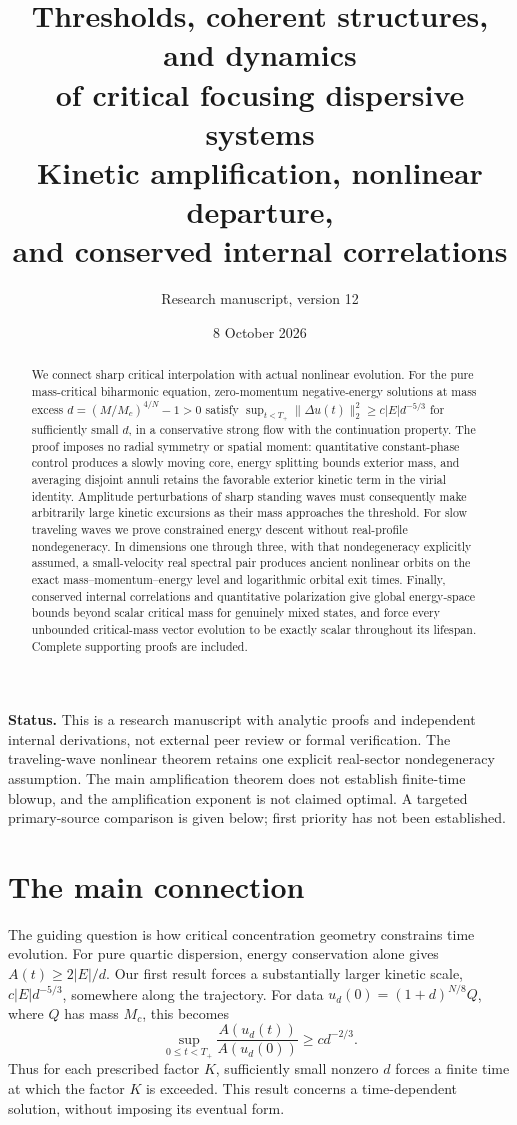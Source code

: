 \documentclass[11pt,a4paper]{article}
\title{Thresholds, coherent structures, and dynamics\\of critical focusing dispersive systems\\[5pt]
\large Kinetic amplification, nonlinear departure,\\and conserved internal correlations}
\author{Research manuscript, version 12}
\date{8 October 2026}
\theoremstyle{remark}\newtheorem{remark}[theorem]{Remark}
\begin{document}
\maketitle
\begin{abstract}
We connect sharp critical interpolation with actual nonlinear evolution.
For the pure mass-critical biharmonic equation, zero-momentum
negative-energy solutions at mass excess
$d=(M/M_c)^{4/N}-1>0$ satisfy
$\sup_{t<T_+}\|\Delta u(t)\|_2^2\ge c|E|d^{-5/3}$ for sufficiently
small $d$, in a conservative strong flow with the continuation property.
The proof imposes no radial symmetry or spatial moment: quantitative
constant-phase control produces a slowly moving core, energy splitting
bounds exterior mass, and averaging disjoint annuli retains the favorable
exterior kinetic term in the virial identity. Amplitude perturbations of
sharp standing waves must consequently make arbitrarily large kinetic
excursions as their mass approaches the threshold.
For slow traveling waves we prove constrained energy descent without
real-profile nondegeneracy. In dimensions one through three, with that
nondegeneracy explicitly assumed, a small-velocity real spectral pair
produces ancient nonlinear orbits on the exact mass--momentum--energy
level and logarithmic orbital exit times. Finally, conserved internal
correlations and quantitative polarization give global energy-space
bounds beyond scalar critical mass for genuinely mixed states, and
force every unbounded critical-mass vector evolution to be exactly
scalar throughout its lifespan. Complete supporting proofs are included.
\end{abstract}

\noindent\textbf{Status.}
This is a research manuscript with analytic proofs and independent
internal derivations, not external peer review or formal verification.
The traveling-wave nonlinear theorem retains one explicit real-sector
nondegeneracy assumption. The main amplification theorem does not
establish finite-time blowup, and the amplification exponent is not
claimed optimal. A targeted primary-source comparison is given below;
first priority has not been established.

\section*{The main connection}
The guiding question is how critical concentration geometry constrains
time evolution. For pure quartic dispersion, energy conservation alone
gives $A(t)\ge2|E|/d$. Our first result forces a substantially larger
kinetic scale, $c|E|d^{-5/3}$, somewhere along the trajectory. For data
$u_d(0)=(1+d)^{N/8}Q$, where $Q$ has mass $M_c$, this becomes
\[
 \sup_{0\le t<T_+}\frac{A(u_d(t))}{A(u_d(0))}\ge c d^{-2/3}.
\]
Thus for each prescribed factor $K$, sufficiently small nonzero $d$
forces a finite time at which the factor $K$ is exceeded. This result
concerns a time-dependent solution, without imposing its eventual form.
\end{document}
